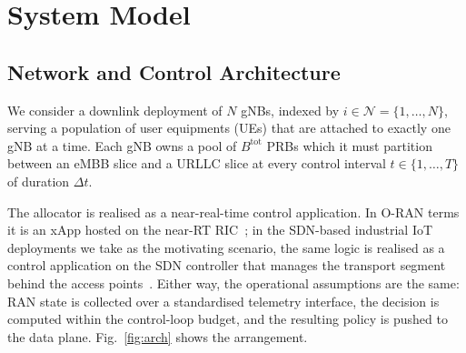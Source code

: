 \documentclass[journal]{IEEEtran}
\begin{document}
\section{System Model}\label{sec:system}

\subsection{Network and Control Architecture}
We consider a downlink deployment of $N$ gNBs, indexed by
$i \in \mathcal{N} = \{1,\dots,N\}$, serving a population of user
equipments (UEs) that are attached to exactly one gNB at a time. Each
gNB owns a pool of $B^{\mathrm{tot}}$ PRBs which it must partition
between an eMBB slice and a URLLC slice at every control interval
$t \in \{1,\dots,T\}$ of duration $\Delta t$.

The allocator is realised as a near-real-time control application. In
O-RAN terms it is an xApp hosted on the near-RT
RIC~\cite{polese2023oran}; in the SDN-based industrial IoT deployments
we take as the motivating scenario, the same logic is realised as a
control application on the SDN controller that manages the transport
segment behind the access points~\cite{shafiq2024sdniot,polverini2026sdnconflicts}.
Either way, the operational assumptions are the same: RAN state is
collected over a standardised telemetry interface, the decision is
computed within the control-loop budget, and the resulting policy is
pushed to the data plane. Fig.~\ref{fig:arch} shows the arrangement.
\end{document}
